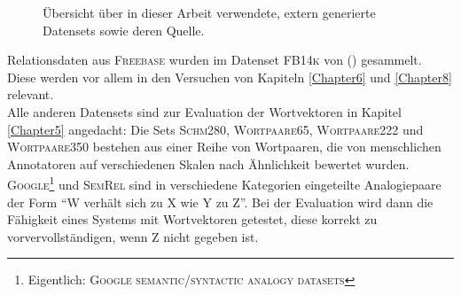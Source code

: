  \begin{figure}[h]
    \centering
    \def\arraystretch{1.5}
  \caption[Übersicht über verwendete vorgefertigte Datensets]{Übersicht über in dieser Arbeit verwendete, extern generierte
  Datensets sowie deren Quelle.\label{fig:datasets}}
  \end{figure}

  Relationsdaten aus \textsc{Freebase} wurden im Datenset \textsc{FB14k} von (\cite{bordes2013translating}) gesammelt.
  Diese werden vor allem in den Versuchen von Kapiteln \ref{Chapter6} und \ref{Chapter8} relevant.\\
  Alle anderen Datensets sind zur Evaluation der Wortvektoren in Kapitel \ref{Chapter5} angedacht: Die Sets
  \textsc{Schm280}, \textsc{Wortpaare65}, \textsc{Wortpaare222} und \textsc{Wortpaare350} bestehen aus einer Reihe
  von Wortpaaren, die von menschlichen Annotatoren auf verschiedenen Skalen nach Ähnlichkeit bewertet wurden.
  \textsc{Google}\footnote{Eigentlich: \textsc{Google semantic/syntactic analogy datasets}} und \textsc{SemRel} sind
  in verschiedene Kategorien eingeteilte Analogiepaare der Form ``W verhält sich zu X wie Y zu Z''. Bei der Evaluation
  wird dann die Fähigkeit eines Systems mit Wortvektoren getestet, diese korrekt zu vorvervollständigen, wenn Z nicht
  gegeben ist.


